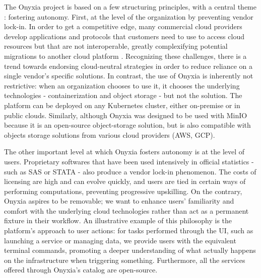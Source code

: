 The Onyxia project is based on a few structuring principles, with a central theme : fostering autonomy. First, at the level of the organization by preventing vendor lock-in. In order to get a competitive edge, many commercial cloud providers develop applications and protocols that customers need to use to access cloud resources but that are not interoperable, greatly complexifying potential migrations to another cloud platform \cite{opara2016critical}. Recognizing these challenges, there is a trend towards endorsing cloud-neutral strategies \cite{opara2017holistic} in order to reduce reliance on a single vendor’s specific solutions. In contrast, the use of Onyxia is inherently not restrictive: when an organization chooses to use it, it chooses the underlying technologies - containerization and object storage - but not the solution. The platform can be deployed on any Kubernetes cluster, either on-premise or in public clouds. Similarly, although Onyxia was designed to be used with MinIO because it is an open-source object-storage solution, but is also compatible with objects storage solutions from various cloud providers (AWS, GCP).

The other important level at which Onyxia fosters autonomy is at the level of users. Proprietary softwares that have been used intensively in official statistics - such as SAS or STATA - also produce a vendor lock-in phenomenon. The costs of licensing are high and can evolve quickly, and users are tied in certain ways of performing computations, preventing progressive upskilling. On the contrary, Onyxia aspires to be removable; we want to enhance users' familiarity and comfort with the underlying cloud technologies rather than act as a permanent fixture in their workflow. An illustrative example of this philosophy is the platform's approach to user actions: for tasks performed through the UI, such as launching a service or managing data, we provide users with the equivalent terminal commands, promoting a deeper understanding of what actually happens on the infrastructure when triggering something. Furthermore, all the services offered through Onyxia's catalog are open-source.


